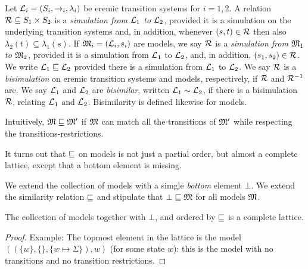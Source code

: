 \begin{definition}
Let $\mathcal{L}_i = (S_i, \rightarrow_i, \lambda_i)$ be eremic transition
systems for $i = 1, 2$.  A relation $\mathcal{R} \subseteq S_1 \times S_2$ is
a \emph{simulation from $\mathcal{L}_1$ to $\mathcal{L}_2$}, provided it is a
simulation on the underlying transition systems and, in addition,
whenever $(s, t) \in \mathcal{R}$ then also $\lambda_2(t) \subseteq
\lambda_1(s)$.  If $\frak{M}_i = (\mathcal{L}_i, s_i)$ are models, we say
$\mathcal{R}$ is a \emph{simulation from $\frak{M}_1$ to $\frak{M}_2$}, provided it
is a simulation from $\mathcal{L}_1$ to $\mathcal{L}_2$, and, in addition, $(s_1,
s_2) \in \mathcal{R}$. We write $\mathcal{L}_1 \sqsubseteq \mathcal{L}_2$ provided there is a
simulation from $\mathcal{L}_1$ to $\mathcal{L}_2$.  We say $\mathcal{R}$ is a
\emph{bisimulation} on eremic transition systems and models,
respectively, if $\mathcal{R}$ and $\mathcal{R}^{-1}$ are. We say $\mathcal{L}_1$ and
$\mathcal{L}_2$ are \emph{bisimilar}, written $\mathcal{L}_1 \sim \mathcal{L}_2$, if
there is a bisimulation $\mathcal{R}$, relating $\mathcal{L}_1$ and $\mathcal{L}_2$.
Bisimilarity is defined likewise for models. 
\end{definition}

\NI Intuitively, $\frak{M} \sqsubseteq \frak{M}'$ if $\frak{M}$ can match all the
transitions of $\frak{M}'$ while respecting   the
transitions-restrictions. 

It turns out that $\sqsubseteq$ on models is not just a partial order, but
almost a complete lattice, except that a bottom element is missing.

\begin{definition}
We extend the collection of models with a simgle \emph{bottom} element
$\bot$. We extend the similarity relation $\sqsubseteq$  and stipulate that $\bot
\sqsubseteq \frak{M}$ for all models $\frak{M}$.
\end{definition}

\begin{theorem}
The collection of models together with $\bot$, and ordered by $\sqsubseteq$
is a complete lattice.  
\end{theorem}
\begin{proof}
  Example: The topmost element in the lattice is
the model $( (\{w\}, \{\}, \{w \mapsto \Sigma\}), w)$ (for some state
$w$): this is the model with no transitions and no transition
restrictions.
\end{proof}

